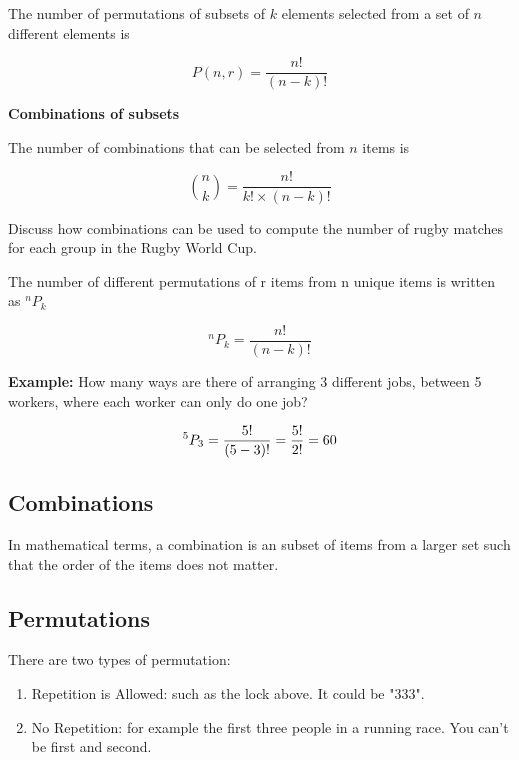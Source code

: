 \documentclass[]{report}
\begin{document}
	The number of permutations of subsets of $k$ elements selected from a set of $n$ different elements is
	
	\[P(n,r) = \frac{n!}{(n-k)!}  \]
	
	
	
	\noindent \textbf{Combinations of subsets}
	
	The number of combinations that can be selected from $n$ items is
	
	\[ {n \choose k} = \frac{n!}{k! \times (n-k)!}  \]
	

	
	Discuss how combinations can be used to compute the number of rugby matches for each group in the Rugby World Cup.
	
	The number of different permutations of r items from n unique items is written as $^n P_k$
	
	
	\[ ^n P_k = \frac{n!}{(n-k)!}\]
	
	\textbf{Example:}
	How many ways are there of arranging 3 different jobs, between 5 workers, where each worker can only do one job?
	
	
	\[ ^5 P_3 = \frac{5!}{(5-3)!}  = {5! \over 2!} = 60\]
	
	
	\subsection{Combinations}
	In mathematical terms, a combination is an subset of items from a larger set such that the order of the items does not matter.
	
	\subsection{Permutations}
	
	There are two types of permutation:
	\begin{enumerate}
		\item Repetition is Allowed: such as the lock above. It could be "333".
		\item No Repetition: for example the first three people in a running race. You can't be first and second.
	\end{enumerate}
	
\end{document}
